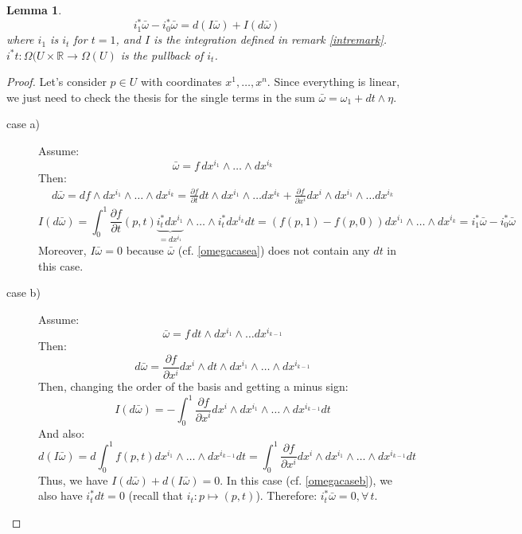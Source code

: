 \documentclass[a4paper,11pt,titlepage, article, oneside]{memoir}
\numberwithin{equation}{section}
\newtheorem{lemma}[theorem]{Lemma}
\theoremstyle{definition}
\theoremstyle{remark}
\newcommand{\rfield}{\mathbb{R}}
\newcommand{\defonde}[2]{\frac{\partial {#1}}{\partial {#2}}}
\begin{document}
\begin{lemma} \label{lemmaform2}
  \begin{equation}
    i_1^* \bar \omega - i_0^* \bar \omega = d(I \bar \omega) + I(d\bar \omega)
  \end{equation}
  where $i_1$ is $i_t$ for $t=1$, and $I$ is the integration defined in remark \ref{intremark}. $i^*t\colon \Omega(U \times \rfield \rightarrow \Omega(U)$ is the pullback of $i_t$.
\end{lemma}
\begin{proof}
  Let's consider $p \in U$ with coordinates $x^1, \ldots, x^n$. Since everything is linear, we just need to check the thesis for the single terms in the sum $\bar \omega = \omega_1 + dt \wedge \eta$.
  \begin{description}
  \item[case a)] Assume:
  \begin{equation} \label{omegacasea}
  \bar \omega = f \, dx^{i_1} \wedge \ldots \wedge dx^{i_k}
  \end{equation}
  Then:
  \begin{align*}
  d \bar \omega = df \wedge dx^{i_1} \wedge \ldots \wedge dx^{i_k} = \defonde{f}{t} dt \wedge dx^{i_1} \wedge \ldots dx^{i_k} + \defonde{f}{x^i} dx^i \wedge dx^{i_1} \wedge \ldots dx^{i_k}
  \end{align*}
  $$I(d\bar \omega) = \int_0^1 \defonde{f}{t}(p, t) \underbrace{i_t^* dx^{i_1}}_{=dx^{i_1}} \wedge \ldots \wedge i_t^* dx^{i_k} dt = (f(p, 1) - f(p, 0)) dx^{i_1} \wedge \ldots \wedge dx^{i_k} = i_1^* \bar \omega - i_0^* \bar \omega$$
  Moreover, $I\bar \omega = 0$ because $\bar \omega$ (cf. \eqref{omegacasea}) does not contain any $dt$ in this case.
  \item[case b)] Assume:
  \begin{equation} \label{omegacaseb}
  \bar \omega  = f\, dt \wedge dx^{i_1} \wedge \ldots dx^{i_{k-1}}
  \end{equation}
  Then:
  $$d \bar \omega = \defonde{f}{x^i} dx^i \wedge dt \wedge dx^{i_1} \wedge \ldots  \wedge dx^{i_{k-1}}$$
  Then, changing the order of the basis and getting a minus sign:
  $$I(d \bar \omega) = - \int_0^1 \defonde{f}{x^i} dx^i \wedge dx^{i_1} \wedge \ldots \wedge dx^{i_{k-1}} dt$$
  And also:
  $$d(I \bar \omega) = d \int_0^1 f(p, t) dx^{i_1} \wedge \ldots \wedge dx^{i_{k-1}} dt = \int_0^1 \defonde{f}{x^i} dx^i \wedge dx^{i_1} \wedge \ldots \wedge dx^{i_{k-1}} dt$$
  Thus, we have $I(d \bar \omega) + d(I \bar \omega) = 0$. In this case (cf. \eqref{omegacaseb}), we also have $i_t^* dt = 0$ (recall that $i_t \colon p \mapsto (p, t)$). Therefore: $i_t^* \bar \omega = 0, \forall \, t$. \qedhere
  \end{description}

  
  
  

\end{proof}
\end{document}

